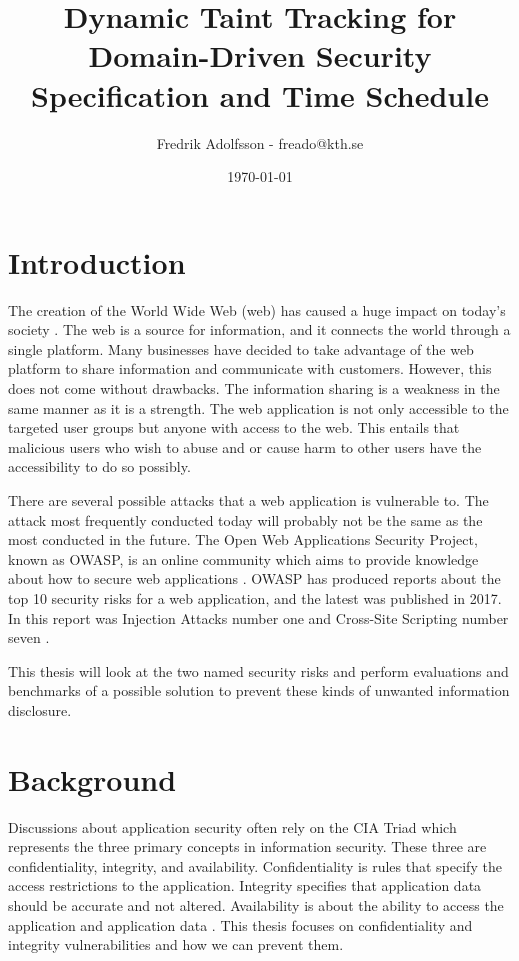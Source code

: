 \documentclass{../kththesis}
\title{Dynamic Taint Tracking for Domain-Driven Security \\
									\large Specification and Time Schedule}
\author{Fredrik Adolfsson - freado@kth.se}
\date{\today}
\begin{document}
	
	\frontmatter
	
	
	
	\titlepage
	
	
	\tableofcontents
	
	
	\mainmatter
	
	
	
	\chapter{Introduction}
	The creation of the World Wide Web (web) has caused a huge impact on today's society \parencite{www}. The web is a source for information, and it connects the world through a single platform. Many businesses have decided to take advantage of the web platform to share information and communicate with customers. However, this does not come without drawbacks. The information sharing is a weakness in the same manner as it is a strength. The web application is not only accessible to the targeted user groups but anyone with access to the web. This entails that malicious users who wish to abuse and or cause harm to other users have the accessibility to do so possibly. 
	
	There are several possible attacks that a web application is vulnerable to. The attack most frequently conducted today will probably not be the same as the most conducted in the future. The Open Web Applications Security Project, known as OWASP, is an online community which aims to provide knowledge about how to secure web applications \parencite{OpenWebApplicationSecurityProject}. OWASP has produced reports about the top 10 security risks for a web application, and the latest was published in 2017. In this report was Injection Attacks number one and Cross-Site Scripting number seven \parencite{OWASP2017, OpenWebApplicationSecurityProject, CrossMichael2007Dgtw}.
	
	This thesis will look at the two named security risks and perform evaluations and benchmarks of a possible solution to prevent these kinds of unwanted information disclosure. 
	
	
	
	\chapter{Background}
	Discussions about application security often rely on the CIA Triad which represents the three primary concepts in information security. These three are confidentiality, integrity, and availability. Confidentiality is rules that specify the access restrictions to the application. Integrity specifies that application data should be accurate and not altered. Availability is about the ability to access the application and application data \parencite{2014C1-W}. This thesis focuses on confidentiality and integrity vulnerabilities and how we can prevent them.
	
\end{document}
